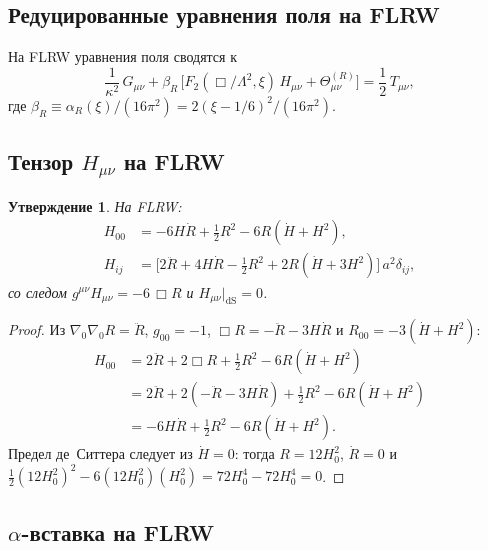 \documentclass[12pt,a4paper]{article}
\newcommand{\Lam}{\Lambda}
\theoremstyle{plain}
\newtheorem{proposition}[theorem]{Утверждение}
\theoremstyle{definition}
\begin{document}
\subsection{Редуцированные уравнения поля на FLRW}

На FLRW уравнения поля сводятся к
\begin{equation}\label{eq:reduced-eom}
  \frac{1}{\kappa^2}\,G_{\mu\nu}
  + \beta_R\,
  \bigl[F_2(\Box/\Lam^2,\xi)\,H_{\mu\nu}
    + \Theta^{(R)}_{\mu\nu}\bigr]
  = \frac{1}{2}\,T_{\mu\nu},
\end{equation}
где $\beta_R \equiv \alpha_R(\xi)/(16\pi^2)
= 2(\xi - 1/6)^2/(16\pi^2)$.

\subsection{Тензор \texorpdfstring{$H_{\mu\nu}$}{Hmunu} на FLRW}

\begin{proposition}
\label{prop:H-FLRW}
На FLRW:
\begin{align}
  H_{00} &= -6H\dot{R} + \tfrac{1}{2}R^2
  - 6R(\dot{H} + H^2), \label{eq:H00-FLRW}\\
  H_{ij} &= \bigl[2\ddot{R} + 4H\dot{R}
  - \tfrac{1}{2}R^2
  + 2R(\dot{H} + 3H^2)\bigr]\,a^2\delta_{ij},
  \label{eq:Hij-FLRW}
\end{align}
со следом $g^{\mu\nu}H_{\mu\nu} = -6\,\Box R$ и
$H_{\mu\nu}|_{\mathrm{dS}} = 0$.
\end{proposition}

\begin{proof}
Из $\nabla_0\nabla_0 R = \ddot{R}$, $g_{00} = -1$,
$\Box R = -\ddot{R} - 3H\dot{R}$ и
$R_{00} = -3(\dot{H} + H^2)$:
\begin{align*}
  H_{00} &= 2\ddot{R} + 2\Box R + \tfrac{1}{2}R^2 - 6R(\dot{H}+H^2) \\
  &= 2\ddot{R} + 2(-\ddot{R} - 3H\dot{R}) + \tfrac{1}{2}R^2
  - 6R(\dot{H}+H^2)\\
  &= -6H\dot{R} + \tfrac{1}{2}R^2 - 6R(\dot{H}+H^2).
\end{align*}
Предел де~Ситтера следует из $\dot{H} = 0$: тогда
$R = 12H_0^2$, $\dot{R} = 0$ и
$\frac{1}{2}(12H_0^2)^2 - 6(12H_0^2)(H_0^2)
= 72H_0^4 - 72H_0^4 = 0$.
\end{proof}

\subsection{$\alpha$-вставка на FLRW}
\end{document}
